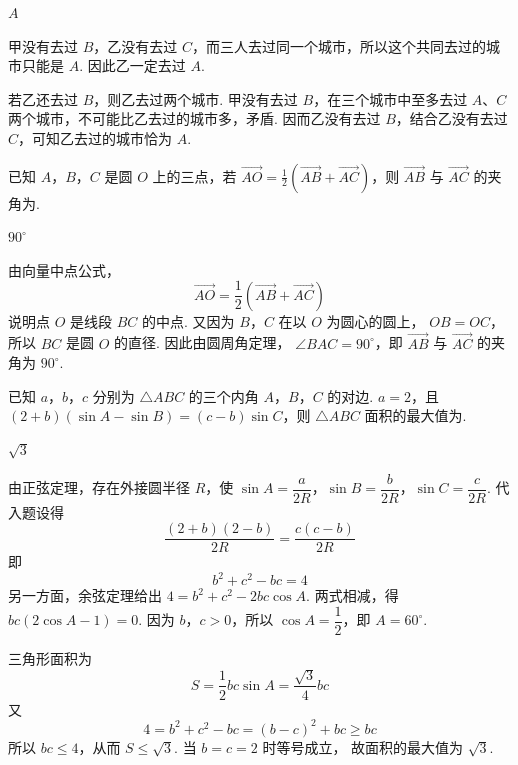 \begin{answer}
\(A\)
\end{answer}

\begin{solution}
甲没有去过 \(B\)，乙没有去过 \(C\)，而三人去过同一个城市，所以这个共同去过的城市只能是 \(A\). 因此乙一定去过 \(A\).

若乙还去过 \(B\)，则乙去过两个城市. 甲没有去过 \(B\)，在三个城市中至多去过 \(A\)、\(C\) 两个城市，不可能比乙去过的城市多，矛盾. 因而乙没有去过 \(B\)，结合乙没有去过 \(C\)，可知乙去过的城市恰为 \(A\).
\end{solution}

\begin{problem}
已知 \(A\)，\(B\)，\(C\) 是圆 \(O\) 上的三点，若 \( \overrightarrow{AO} = \frac{1}{2}\left(\overrightarrow{AB} + \overrightarrow{AC}\right) \)，则 \( \overrightarrow{AB} \) 与 \( \overrightarrow{AC} \) 的夹角为\fillinblank{}.
\end{problem}

\begin{answer}
\(90^{\circ}\)
\end{answer}

\begin{solution}
由向量中点公式，
\[
\overrightarrow{AO}=\frac12\left(\overrightarrow{AB}+\overrightarrow{AC}\right)
\]
说明点 \(O\) 是线段 \(BC\) 的中点. 又因为 \(B\)，\(C\) 在以 \(O\) 为圆心的圆上，
\(OB=OC\)，所以 \(BC\) 是圆 \(O\) 的直径. 因此由圆周角定理，
\(\angle BAC=90^{\circ}\)，即 \(\overrightarrow{AB}\) 与 \(\overrightarrow{AC}\) 的夹角为
\(90^{\circ}\).
\end{solution}

\begin{problem}
已知 \(a\)，\(b\)，\(c\) 分别为 \(\triangle ABC\) 的三个内角 \(A\)，\(B\)，\(C\) 的对边. \(a = 2\)，且 \((2 + b)(\sin A - \sin B) = (c - b)\sin C\)，则 \(\triangle ABC\) 面积的最大值为\fillinblank{}.
\end{problem}

\begin{answer}
\(\sqrt{3}\)
\end{answer}

\begin{solution}
由正弦定理，存在外接圆半径 \(R\)，使
\(\sin A=\dfrac{a}{2R}\)，\(\sin B=\dfrac{b}{2R}\)，\(\sin C=\dfrac{c}{2R}\). 代入题设得
\[
\frac{(2+b)(2-b)}{2R}=\frac{c(c-b)}{2R}
\]
即
\[
b^2+c^2-bc=4
\]
另一方面，余弦定理给出
\(4=b^2+c^2-2bc\cos A\). 两式相减，得
\(bc(2\cos A-1)=0\). 因为 \(b\)，\(c>0\)，所以 \(\cos A=\dfrac12\)，即
\(A=60^{\circ}\).

三角形面积为
\[
S=\frac12bc\sin A=\frac{\sqrt3}{4}bc
\]
又
\[
4=b^2+c^2-bc=(b-c)^2+bc\geqslant bc
\]
所以 \(bc\leqslant4\)，从而 \(S\leqslant\sqrt3\). 当 \(b=c=2\) 时等号成立，
故面积的最大值为 \(\sqrt3\).
\end{solution}

